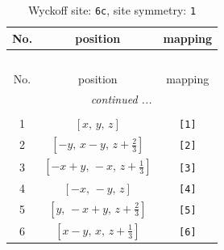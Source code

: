 \documentclass[fleqn,8pt]{jsarticle}
\begin{document}
\renewcommand{\arraystretch}{1.2}
\begin{longtable}{ccc}
\caption{Wyckoff site: {\tt 6c}, site symmetry: {\tt 1}}
 \\
 \hline \hline
No. & position & mapping \\ \hline \endfirsthead

\multicolumn{2}{l}{\tablename\ \thetable{}} \\
 \hline \hline
No. & position & mapping \\ \hline \endhead

 \hline \hline
\multicolumn{2}{r}{\footnotesize\it continued ...} \\ \endfoot

 \hline \hline
\multicolumn{2}{r}{} \\ \endlastfoot

1 & $\left[ x,\, y,\, z \right]$ & {\tt [1]} \\ \hline
2 & $\left[ - y,\, x - y,\, z + \frac{2}{3} \right]$ & {\tt [2]} \\ \hline
3 & $\left[ - x + y,\, - x,\, z + \frac{1}{3} \right]$ & {\tt [3]} \\ \hline
4 & $\left[ - x,\, - y,\, z \right]$ & {\tt [4]} \\ \hline
5 & $\left[ y,\, - x + y,\, z + \frac{2}{3} \right]$ & {\tt [5]} \\ \hline
6 & $\left[ x - y,\, x,\, z + \frac{1}{3} \right]$ & {\tt [6]} \\
\end{longtable}
\end{document}
